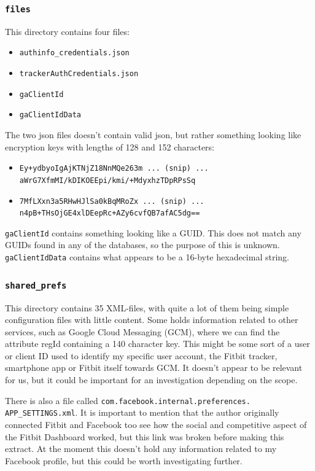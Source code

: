 \documentclass[a4paper,11pt,dvips]{article}
\begin{document}
\subsubsection{\texttt{files}}

This directory contains four files:

\begin{itemize}
\item \texttt{authinfo\_credentials.json}
\item \texttt{trackerAuthCredentials.json}
\item \texttt{gaClientId}
\item \texttt{gaClientIdData}
\end{itemize}

\noindent
The two json files doesn't contain valid json, but rather something looking like encryption keys with lengths of 128 and 152 characters:

\scriptsize
\begin{itemize}
\item \texttt{Ey+ydbyoIgAjKTNjZ18NnMQe263m ... (snip) ... aWrG7XfmMI/kDIKOEEpi/kmi/+MdyxhzTDpRPsSq}
\item \texttt{7MfLXxn3a5RHwHJlSa0kBqMRoZx ... (snip) ... n4pB+THsOjGE4xlDEepRc+AZy6cvfQB7afAC5dg==}
\end{itemize}
\normalsize

\noindent
\texttt{gaClientId} contains something looking like a GUID. This does not match any GUIDs found in any of the databases, so the purpose of this is unknown. \texttt{gaClientIdData} contains what appears to be a 16-byte hexadecimal string.

\subsubsection{\texttt{shared\_prefs}}
This directory contains 35 XML-files, with quite a lot of them being simple configuration files with little content. Some holds information related to other services, such as Google Cloud Messaging (GCM), where we can find the attribute regId containing a 140 character key. This might be some sort of a user or client ID used to identify my specific user account, the Fitbit tracker, smartphone app or Fitbit itself towards GCM. It doesn’t appear to be relevant for us, but it could be important for an investigation depending on the scope.

There is also a file called \texttt{com.facebook.internal.preferences.} \\ \texttt{APP\_SETTINGS.xml}. It is important to mention that the author originally connected Fitbit and Facebook too see how the social and competitive aspect of the Fitbit Dashboard worked, but this link was broken before making this extract. At the moment this doesn’t hold any information related to my Facebook profile, but this could be worth investigating further.
\end{document}
